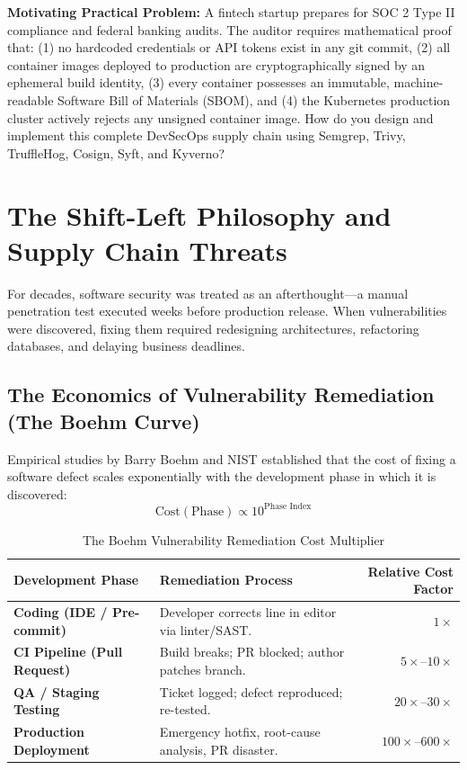 \begin{chaptergoalsbox}
\textbf{Motivating Practical Problem:}
A fintech startup prepares for SOC 2 Type II compliance and federal banking audits. The auditor requires mathematical proof that: (1) no hardcoded credentials or API tokens exist in any git commit, (2) all container images deployed to production are cryptographically signed by an ephemeral build identity, (3) every container possesses an immutable, machine-readable Software Bill of Materials (SBOM), and (4) the Kubernetes production cluster actively rejects any unsigned container image. How do you design and implement this complete DevSecOps supply chain using Semgrep, Trivy, TruffleHog, Cosign, Syft, and Kyverno?
\end{chaptergoalsbox}

\section{The Shift-Left Philosophy and Supply Chain Threats}

For decades, software security was treated as an afterthought---a manual penetration test executed weeks before production release. When vulnerabilities were discovered, fixing them required redesigning architectures, refactoring databases, and delaying business deadlines.

\subsection{The Economics of Vulnerability Remediation (The Boehm Curve)}
Empirical studies by Barry Boehm and NIST established that the cost of fixing a software defect scales exponentially with the development phase in which it is discovered:
\begin{equation}
\text{Cost}(\text{Phase}) \propto 10^{\text{Phase Index}}
\end{equation}

\begin{table}[htbp]
\centering\small
\begin{tabular}{lp{6.5cm}r}
\toprule
\textbf{Development Phase} & \textbf{Remediation Process} & \textbf{Relative Cost Factor} \\
\midrule
\textbf{Coding (IDE / Pre-commit)} & Developer corrects line in editor via linter/SAST. & $1\times$ \\
\textbf{CI Pipeline (Pull Request)} & Build breaks; PR blocked; author patches branch. & $5\times$--$10\times$ \\
\textbf{QA / Staging Testing} & Ticket logged; defect reproduced; re-tested. & $20\times$--$30\times$ \\
\textbf{Production Deployment} & Emergency hotfix, root-cause analysis, PR disaster. & $100\times$--$600\times$ \\
\bottomrule
\end{tabular}
\caption{The Boehm Vulnerability Remediation Cost Multiplier}
\label{tab:boehm-curve}
\end{table}

